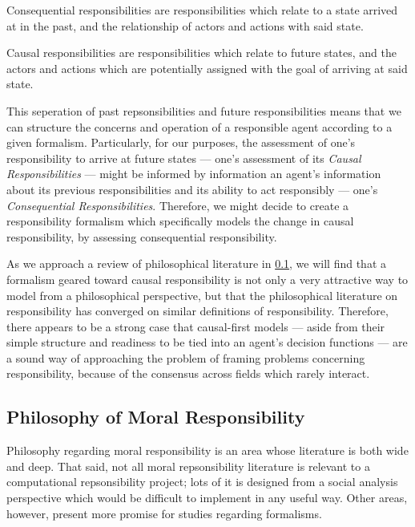 \begin{displayquote}
    Consequential responsibilities are responsibilities which relate to a state arrived at in the past, and the relationship of actors and actions with said state.
\end{displayquote}\par

\begin{displayquote}
    Causal responsibilities are responsibilities which relate to future states, and the actors and actions which are potentially assigned with the goal of arriving at said state.
\end{displayquote}

This seperation of past repsonsibilities and future responsibilities means that we can structure the concerns and operation of a responsible agent according to a given formalism. Particularly, for our purposes, the assessment of one's responsibility to arrive at future states --- one's assessment of its \emph{Causal Responsibilities} --- might be informed by information an agent's information about its previous responsibilities and its ability to act responsibly --- one's \emph{Consequential Responsibilities}. Therefore, we might decide to create a responsibility formalism which specifically models the change in causal responsibility, by assessing consequential responsibility.\par

As we approach a review of philosophical literature in \cref{subsec:philosophy}, we will find that a formalism geared toward causal responsibility is not only a very attractive way to model from a philosophical perspective, but that the philosophical literature on responsibility has converged on similar definitions of responsibility. Therefore, there appears to be a strong case that causal-first models --- aside from their simple structure and readiness to be tied into an agent's decision functions --- are a sound way of approaching the problem of framing problems concerning responsibility,  because of the consensus across fields which rarely interact.

\subsection{Philosophy of Moral Responsibility}\label{subsec:philosophy}
Philosophy regarding moral responsibility is an area whose literature is both wide and deep. That said, not all moral repsonsibility literature is relevant to a computational repsonsibility project; lots of it is designed from a social analysis perspective which would be difficult to implement in any useful way. Other areas, however, present more promise for studies regarding formalisms.\par

